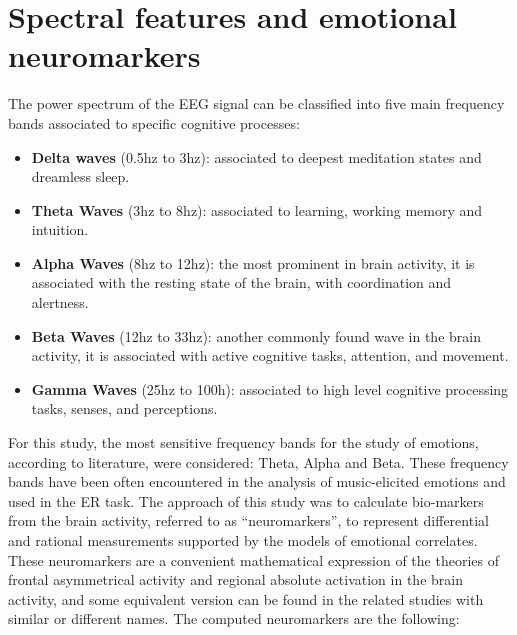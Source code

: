 \section{Spectral features and emotional neuromarkers}
\label{sec:neuromarkers}
The power spectrum of the EEG signal can be classified into five main frequency bands associated to specific cognitive processes: 
\begin{itemize}
\item  	\textbf{Delta waves} (0.5hz to 3hz): associated to deepest meditation states and dreamless sleep.
\item 	\textbf{Theta Waves} (3hz to 8hz): associated to learning, working memory and intuition.
\item 	\textbf{Alpha Waves} (8hz to 12hz): the most prominent in brain activity, it is associated with the resting state of the brain, with coordination and alertness.
\item 	\textbf{Beta Waves} (12hz to 33hz): another commonly found wave in the brain activity, it is associated with active cognitive tasks, attention, and movement.
\item 	\textbf{Gamma Waves} (25hz to 100h): associated to high level cognitive processing tasks, senses, and perceptions.
\end{itemize}
For this study, the most sensitive frequency bands for the study of emotions, according to literature, were considered: Theta, Alpha and Beta. These frequency bands have been often encountered in the analysis of music-elicited emotions and used in the \ac{ER} task. The approach of this study was to calculate bio-markers from the brain activity, referred to as “neuromarkers”, to represent differential and rational measurements supported by the models of emotional correlates. These neuromarkers are a convenient mathematical expression of the theories of frontal asymmetrical activity and regional absolute activation in the brain activity, and some equivalent version can be found in the related studies with similar or different names. The computed neuromarkers are the following:
	

